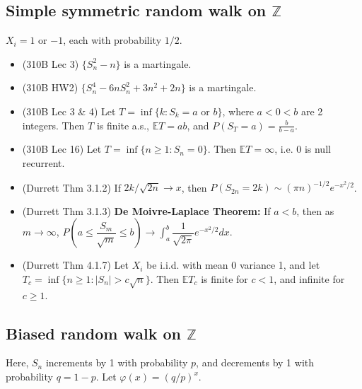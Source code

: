 \documentclass[twoside]{article}
\newcommand{\dis}{\displaystyle}
\newcommand\bbE{\mathbb{E}}
\newcommand\bbZ{\mathbb{Z}}
\newcommand\goesto{\rightarrow}
\begin{document}
\subsection*{Simple symmetric random walk on $\bbZ$}
$X_i = 1$ or $-1$, each with probability $1/2$.
\begin{itemize}
\item (310B Lec 3) $\{ S_n^2 - n\}$ is a martingale.

\item (310B HW2) $\{ S_n^4 - 6nS_n^2 +3n^2 + 2n \}$ is a martingale.

\item (310B Lec 3 \& 4) Let $T = \inf \{ k: S_k = a \text{ or } b\}$, where $a < 0 < b$ are 2 integers. Then $T$ is finite a.s., $\bbE T = ab$, and $P(S_T = a) = \dis\frac{b}{b-a}$.

\item (310B Lec 16) Let $T = \inf\{ n \geq 1: S_n = 0\}$. Then $\bbE T = \infty$, i.e. 0 is null recurrent.

\item (Durrett Thm 3.1.2) If $2k / \sqrt{2n} \goesto x$, then $P(S_{2n} = 2k) \sim (\pi n)^{-1/2} e^{-x^2/2}$.

\item (Durrett Thm 3.1.3) \textbf{De Moivre-Laplace Theorem:} If $a < b$, then as $m \goesto \infty$, $P \left(a \leq \dfrac{S_m}{\sqrt{m}} \leq b \right) \goesto \dis\int_a^b \dfrac{1}{\sqrt{2\pi}} e^{-x^2/2} dx$.

\item (Durrett Thm 4.1.7) Let $X_i$ be i.i.d. with mean 0 variance 1, and let $T_c = \inf \{ n \geq 1: |S_n| > c\sqrt{n}\}$. Then $\bbE T_c$ is finite for $c < 1$, and infinite for $c \geq 1$.

\end{itemize}



\subsection*{Biased random walk on $\bbZ$}
Here, $S_n$ increments by 1 with probability $p$, and decrements by 1 with probability $q = 1- p$. Let $\varphi(x) = (q/p)^x$.
\end{document}
